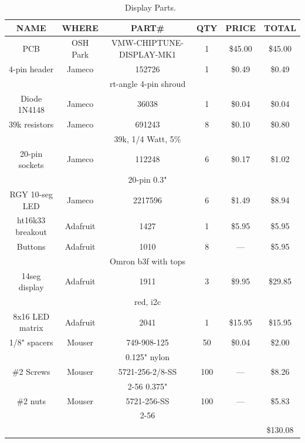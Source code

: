 \documentclass[11pt]{article}
\begin{document}
\begin{table}[th]

\caption{Display Parts.~\label{table:display_parts}}
\centering
\sf
\begin{tabular}{|c|c|c|c|c|c|}
\hline
NAME		& WHERE		& PART\#	           & QTY & PRICE    & TOTAL \\
\hline
\hline
PCB		& OSH Park	& VMW-CHIPTUNE-DISPLAY-MK1 & 1	 & \$45.00  & \$45.00 \\
\hline
4-pin header	& Jameco	& 152726                   & 1	 & \$0.49   &  \$0.49 \\
		&		& rt-angle 4-pin shroud	   &	 &          &         \\
\hline
Diode 1N4148	& Jameco	& 36038		           & 1	 & \$0.04   &  \$0.04 \\
\hline
39k resistors	& Jameco	& 691243		   & 8   &  \$0.10  &  \$0.80 \\
		&		& 39k, 1/4 Watt, 5\%	   &     &          &         \\
\hline
20-pin sockets	& Jameco	& 112248		   & 6	 &  \$0.17  &  \$1.02 \\
		&		& 20-pin 0.3"		   &     &          &         \\
\hline
RGY 10-seg LED	& Jameco	& 2217596		   & 6	 &  \$1.49  &  \$8.94 \\
\hline
ht16k33 breakout	& Adafruit	& 1427		           & 1	 & \$5.95   &  \$5.95 \\
\hline
Buttons		& Adafruit	& 1010			   & 8	 & ---	    &  \$5.95 \\
		&		& Omron b3f with tops	   &     &          &         \\
\hline
14seg display	& Adafruit	& 1911			   & 3	 & \$9.95   & \$29.85 \\
		&		& red, i2c		   &	 &          &	      \\  
\hline
8x16 LED matrix	& Adafruit	& 2041			   & 1	 & \$15.95  & \$15.95 \\
\hline

1/8" spacers	& Mouser	& 749-908-125		   & 50  & \$0.04   & \$2.00  \\
		& 		& 0.125" nylon		   &     &          &         \\
\hline
\#2 Screws	& Mouser	& 5721-256-2/8-SS	   & 100 & --- 	    & \$8.26  \\
		&		& 2-56 0.375"		   &     &          &         \\
\hline
\#2 nuts	& Mouser	& 5721-256-SS	   	   & 100 & --- 	    & \$5.83  \\
		&		& 2-56		   	   &     &          &         \\
\hline
\hline
		&		&		&	&		& \$130.08 \\
\hline
\end{tabular}
\end{table}
\end{document}
